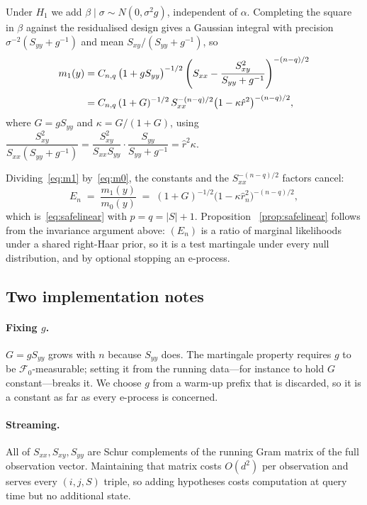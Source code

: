 \documentclass[pdflatex,sn-apa]{sn-jnl}
\theoremstyle{thmstyleone}%
\theoremstyle{thmstyletwo}%
\theoremstyle{thmstylethree}%
\newcommand{\Fcal}{\mathcal{F}}
\begin{document}
\begin{appendices}
Under $H_1$ we add $\beta \mid \sigma \sim N(0, \sigma^2 g)$, independent of
$\alpha$. Completing the square in $\beta$ against the residualised design
gives a Gaussian integral with precision $\sigma^{-2}(S_{yy} + g^{-1})$ and
mean $S_{xy}/(S_{yy} + g^{-1})$, so
\begin{align}
m_1(y)
&= C_{n,q} \, \bigl(1 + gS_{yy}\bigr)^{-1/2}
   \left( S_{xx} - \frac{S_{xy}^2}{S_{yy} + g^{-1}} \right)^{-(n-q)/2}
   \notag \\[2pt]
&= C_{n,q} \, (1+G)^{-1/2} \,
   S_{xx}^{-(n-q)/2} \bigl(1 - \kappa \hat r^2\bigr)^{-(n-q)/2},
   \label{eq:m1}
\end{align}
where $G = gS_{yy}$ and $\kappa = G/(1+G)$, using
$\dfrac{S_{xy}^2}{S_{xx}(S_{yy}+g^{-1})}
 = \dfrac{S_{xy}^2}{S_{xx}S_{yy}} \cdot \dfrac{S_{yy}}{S_{yy}+g^{-1}}
 = \hat r^2 \kappa$.

Dividing~\eqref{eq:m1} by~\eqref{eq:m0}, the constants and the
$S_{xx}^{-(n-q)/2}$ factors cancel:
\begin{equation}\label{eq:bf}
E_n \;=\; \frac{m_1(y)}{m_0(y)}
\;=\; (1+G)^{-1/2} \bigl(1 - \kappa \hat r_n^2\bigr)^{-(n-q)/2},
\end{equation}
which is~\eqref{eq:safelinear} with $p = q = |S|+1$. Proposition~%
\ref{prop:safelinear} follows from the invariance argument above:
$(E_n)$ is a ratio of marginal likelihoods under a shared right-Haar prior, so
it is a test martingale under every null distribution, and by optional
stopping an e-process.

\subsection{Two implementation notes}

\paragraph{Fixing $g$.} $G = gS_{yy}$ grows with $n$ because $S_{yy}$ does.
The martingale property requires $g$ to be $\Fcal_0$-measurable; setting it
from the running data---for instance to hold $G$ constant---breaks it. We
choose $g$ from a warm-up prefix that is discarded, so it is a constant as far
as every e-process is concerned.

\paragraph{Streaming.} All of $S_{xx}, S_{xy}, S_{yy}$ are Schur complements
of the running Gram matrix of the full observation vector. Maintaining that
matrix costs $O(d^2)$ per observation and serves every $(i,j,S)$ triple, so
adding hypotheses costs computation at query time but no additional state.


\end{appendices}
\end{document}
